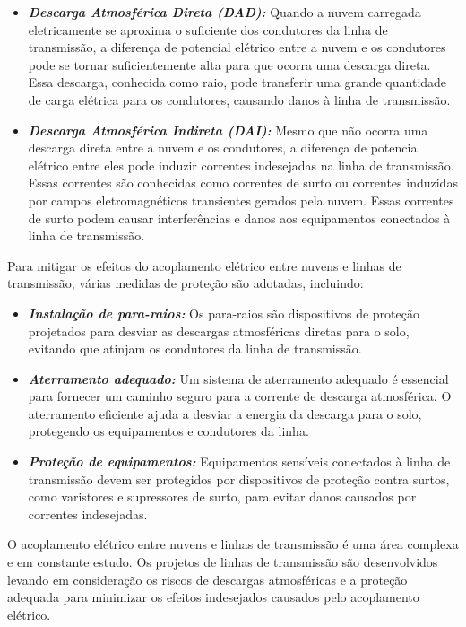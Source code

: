 \documentclass[a4paper, 12pt, onecolumn,singlespacing]{article}
\begin{document}
		\begin{itemize}
			\item \textbf{\textit{Descarga Atmosférica Direta (DAD):}} Quando a nuvem carregada eletricamente se aproxima o suficiente dos condutores da linha de transmissão, a diferença de potencial elétrico entre a nuvem e os condutores pode se tornar suficientemente alta para que ocorra uma descarga direta. Essa descarga, conhecida como raio, pode transferir uma grande quantidade de carga elétrica para os condutores, causando danos à linha de transmissão.
			
			\item \textbf{\textit{Descarga Atmosférica Indireta (DAI):}} Mesmo que não ocorra uma descarga direta entre a nuvem e os condutores, a diferença de potencial elétrico entre eles pode induzir correntes indesejadas na linha de transmissão. Essas correntes são conhecidas como correntes de surto ou correntes induzidas por campos eletromagnéticos transientes gerados pela nuvem. Essas correntes de surto podem causar interferências e danos aos equipamentos conectados à linha de transmissão.
			
		\end{itemize}
				
		Para mitigar os efeitos do acoplamento elétrico entre nuvens e linhas de transmissão, várias medidas de proteção são adotadas, incluindo:
		
		\begin{itemize}
			\item \textbf{\textit{Instalação de para-raios:}} Os para-raios são dispositivos de proteção projetados para desviar as descargas atmosféricas diretas para o solo, evitando que atinjam os condutores da linha de transmissão.
			\item \textbf{\textit{Aterramento adequado:}} Um sistema de aterramento adequado é essencial para fornecer um caminho seguro para a corrente de descarga atmosférica. O aterramento eficiente ajuda a desviar a energia da descarga para o solo, protegendo os equipamentos e condutores da linha.
			\item \textbf{\textit{Proteção de equipamentos:}} Equipamentos sensíveis conectados à linha de transmissão devem ser protegidos por dispositivos de proteção contra surtos, como varistores e supressores de surto, para evitar danos causados por correntes indesejadas.
		\end{itemize}
		
		O acoplamento elétrico entre nuvens e linhas de transmissão é uma área complexa e em constante estudo. Os projetos de linhas de transmissão são desenvolvidos levando em consideração os riscos de descargas atmosféricas e a proteção adequada para minimizar os efeitos indesejados causados pelo acoplamento elétrico.
		
\end{document}
